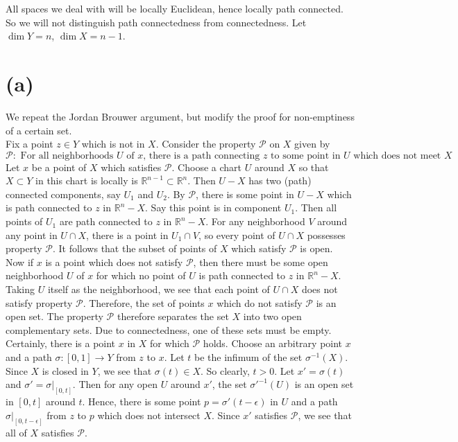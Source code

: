 \documentclass{amsbook}
\theoremstyle{theorem}
\theoremstyle{plain}
\theoremstyle{remark}
\newcommand{\R}{\mathbb R}
\newcommand{\PP}{\mathscr P}
\begin{document}
All spaces we deal with will be locally Euclidean, hence locally path connected. So we will not distinguish path connectedness from connectedness. Let $\dim Y = n$, $\dim X = n-1$. 

\section*{(a)}

We repeat the Jordan Brouwer argument, but modify the proof for non-emptiness of a certain set.\\

Fix a point $z \in Y$ which is not in $X$. Consider the property $\PP$ on $X$ given by \[\PP: \text{ For all neighborhoods $U$ of $x$, there is a path connecting $z$ to some point in $U$ which does not meet $X$}.\] Let $x$ be a point of $X$ which satisfies $\PP$. Choose a chart $U$ around $X$ so that $X\subset Y$ in this chart is locally is $\R^{n-1} \subset \R^n$. Then $U-X$ has two (path) connected components, say $U_1$ and $U_2$. By $\PP$, there is some point in $U-X$ which is path connected to $z$ in $\R^n-X$. Say this point is in component $U_1$. Then all points of $U_1$ are path connected to $z$ in $\R^n-X$. For any neighborhood $V$ around any point in $U\cap X$, there is a point in $U_1 \cap V$, so every point of $U\cap X$ possesses property $\PP$. It follows that the subset of points of $X$ which satisfy $\PP$ is open.\\

Now if $x$ is a point which does not satisfy $\PP$, then there must be some open neighborhood $U$ of $x$ for which no point of $U$ is path connected to $z$ in $\R^n-X$. Taking $U$ itself as the neighborhood, we see that each point of $U\cap X$ does not satisfy property $\PP$. Therefore, the set of points $x$ which do not satisfy $\PP$ is an open set. The property $\PP$ therefore separates the set $X$ into two open complementary sets. Due to connectedness, one of these sets must be empty.\\

Certainly, there is a point $x$ in $X$ for which $\PP$ holds. Choose an arbitrary point $x$ and a path $\sigma: [0,1]\to Y$ from $z$ to $x$. Let $t$ be the infimum of the set $\sigma^{-1}(X)$. Since $X$ is closed in $Y$, we see that $\sigma(t) \in X$. So clearly, $t>0$. Let $x' = \sigma(t)$ and $\sigma' = \sigma|_{[0,t]}$. Then for any open $U$ around $x'$, the set $\sigma'^{-1}(U)$ is an open set in $[0,t]$ around $t$. Hence, there is some point $p = \sigma'(t-\epsilon)$ in $U$ and a path $\sigma|_{[0,t-\epsilon]}$ from $z$ to $p$ which does not intersect $X$. Since $x'$ satisfies $\PP$, we see that all of $X$ satisfies $\PP$. \\
\end{document}
